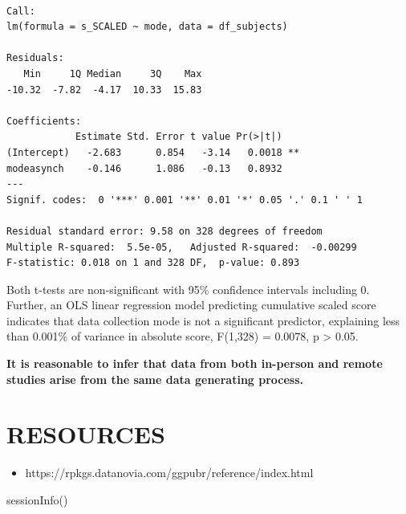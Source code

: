 \documentclass[
  letterpaper,
  DIV=11,
  numbers=noendperiod]{scrreprt}
\newenvironment{Shaded}{\begin{snugshade}}{\end{snugshade}}
\newcommand{\FunctionTok}[1]{\textcolor[rgb]{0.28,0.35,0.67}{#1}}
\newcommand{\NormalTok}[1]{\textcolor[rgb]{0.00,0.23,0.31}{#1}}
\providecommand{\tightlist}{%
  \setlength{\itemsep}{0pt}\setlength{\parskip}{0pt}}\usepackage{longtable,booktabs,array}
\begin{document}
\begin{verbatim}

Call:
lm(formula = s_SCALED ~ mode, data = df_subjects)

Residuals:
   Min     1Q Median     3Q    Max 
-10.32  -7.82  -4.17  10.33  15.83 

Coefficients:
            Estimate Std. Error t value Pr(>|t|)   
(Intercept)   -2.683      0.854   -3.14   0.0018 **
modeasynch    -0.146      1.086   -0.13   0.8932   
---
Signif. codes:  0 '***' 0.001 '**' 0.01 '*' 0.05 '.' 0.1 ' ' 1

Residual standard error: 9.58 on 328 degrees of freedom
Multiple R-squared:  5.5e-05,   Adjusted R-squared:  -0.00299 
F-statistic: 0.018 on 1 and 328 DF,  p-value: 0.893
\end{verbatim}

Both t-tests are non-significant with 95\% confidence intervals
including 0. Further, an OLS linear regression model predicting
cumulative scaled score indicates that data collection mode is not a
significant predictor, explaining less than 0.001\% of variance in
absolute score, F(1,328) = 0.0078, p \textgreater{} 0.05.

\begin{tcolorbox}[enhanced jigsaw, toptitle=1mm, toprule=.15mm, bottomtitle=1mm, leftrule=.75mm, title={Decision}, opacityback=0, titlerule=0mm, opacitybacktitle=0.6, colframe=quarto-callout-color-frame, rightrule=.15mm, breakable, bottomrule=.15mm, colbacktitle=quarto-callout-color!10!white, coltitle=black, arc=.35mm, colback=white, left=2mm]
\textbf{It is reasonable to infer that data from both in-person and
remote studies arise from the same data generating process.}
\end{tcolorbox}

\hypertarget{resources-2}{%
\section{RESOURCES}\label{resources-2}}

\begin{itemize}
\tightlist
\item
  https://rpkgs.datanovia.com/ggpubr/reference/index.html
\end{itemize}

\begin{Shaded}
\begin{Highlighting}[]
\FunctionTok{sessionInfo}\NormalTok{()}
\end{Highlighting}
\end{Shaded}
\end{document}

